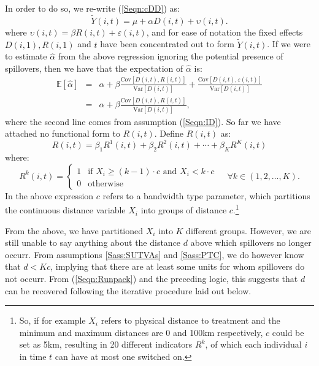 \documentclass{article}
\newcommand{\Var}{\mathrm{Var}}
\newcommand{\Cov}{\mathrm{Cov}}
\newcommand{\Bias}[2]{\frac{\Cov[#1,#2]}{\Var[#1]}}
\begin{document}
\begin{spacing}{1.1}
In order to do so, we re-write (\ref{Seqn:cDD}) as:
\begin{equation}
\label{Seqn:cDDconc}
\tilde{Y}(i,t)=\mu + \alpha D(i,t) + \upsilon(i,t).
\end{equation}
where $\upsilon(i,t)=\beta R(i,t)+\varepsilon(i,t)$, and for ease of notation
the fixed effects $D(i,1), R(i,1)$ and $t$ have been concentrated out to form
$\tilde{Y}(i,t)$.  If we were to estimate $\hat\alpha$ from the above regression
ignoring the potential presence of spillovers, then we have that the 
expectation of $\hat\alpha$ is:
\begin{eqnarray}
\label{Seqn:alphaExp}
\mathbb{E}[\hat\alpha] &=& \alpha + \beta\Bias{D(i,t)}{R(i,t)}+\Bias{D(i,t)}{\varepsilon(i,t)} \nonumber \\ 
              &=& \alpha + \beta\Bias{D(i,t)}{R(i,t)},
\end{eqnarray}
where the second line comes from assumption (\ref{Seqn:ID}).  So far we have
attached no functional form to $R(i,t)$.  Define $R(i,t)$ as:
\begin{equation}
\label{Seqn:Runpack}
R(i,t) = \beta_1R^1(i,t)+\beta_2R^2(i,t)+ \cdots + \beta_KR^K(i,t)
\end{equation}  
where:
\begin{equation}
 R^k(i,t) =
  \begin{cases}
   1   & \text{if\ \ } X_i\geq(k-1)\cdot c \text{\ \ and \ } X_i<k\cdot c \\
   0   & \text{otherwise} 
  \end{cases}\ \ \ \ \ \forall k \in (1,2,\ldots,K).
\end{equation}
In the above expression $c$ refers to a bandwidth type parameter, which partitions
the continuous distance variable $X_i$ into groups of distance $c$.\footnote{So, if
for example $X_i$ refers to physical distance to treatment and the minimum and 
maximum distances are 0 and 100km respectively, $c$ could be set as 5km, resulting
in 20 different indicators $R^k$, of which each individual $i$ in time $t$ can
have at most one switched on.}

From the above, we have partitioned $X_i$ into $K$ different groups.  However, we
are still unable to say anything about the distance $d$ above which spillovers no 
longer occurr.  From assumptions \ref{Sass:SUTVAs} and \ref{Sass:PTC}, we do however
know that $d<Kc$, implying that there are at least some units for whom spillovers
do not occurr.  From (\ref{Seqn:Runpack}) and the preceding logic, this suggests
that $d$ can be recovered following the iterative procedure laid out below.



\end{spacing}
\end{document}
